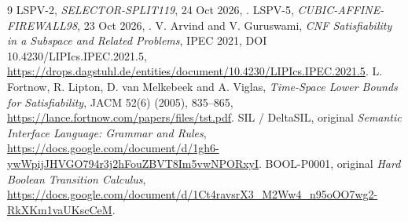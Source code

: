 \documentclass[11pt]{article}
\begin{document}
\begin{thebibliography}{9}
 LSPV-2, \emph{SELECTOR-SPLIT119}, 24 Oct 2026,
.
 LSPV-5, \emph{CUBIC-AFFINE-FIREWALL98}, 23 Oct 2026,
.
 V. Arvind and V. Guruswami, \emph{CNF Satisfiability in a Subspace and Related Problems},
IPEC 2021, DOI 10.4230/LIPIcs.IPEC.2021.5,
\url{https://drops.dagstuhl.de/entities/document/10.4230/LIPIcs.IPEC.2021.5}.
 L. Fortnow, R. Lipton, D. van Melkebeek and A. Viglas,
\emph{Time-Space Lower Bounds for Satisfiability}, JACM 52(6) (2005), 835--865,
\url{https://lance.fortnow.com/papers/files/tst.pdf}.
 SIL / DeltaSIL, original \emph{Semantic Interface Language: Grammar and Rules},
\url{https://docs.google.com/document/d/1gh6-ywWpijJHVGO794r3j2hFouZBVT8Im5vwNPORxyI}.
 BOOL-P0001, original \emph{Hard Boolean Transition Calculus},
\url{https://docs.google.com/document/d/1Ct4ravsrX3_M2Ww4_n95oOO7wg2-RkXKm1vaUKscCeM}.
\end{thebibliography}
\end{document}
